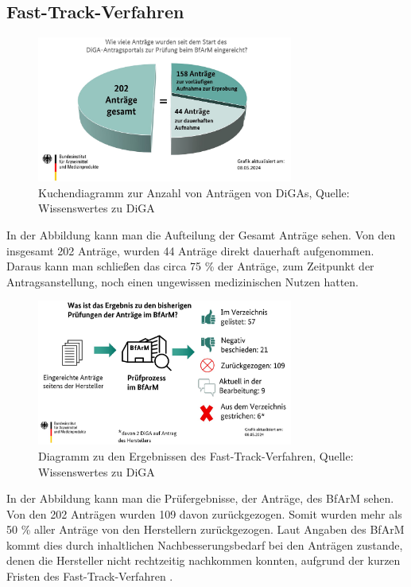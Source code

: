 \documentclass{article}
\begin{document}
		\subsection{Fast-Track-Verfahren} 
			\begin{figure}[htbp]
				\centering
				\includegraphics[width=0.75\textwidth]{./grafiken/Anzahl_Antraege_DiGA}
				\caption[Anzahl Anträge von DiGAs]{Kuchendiagramm zur Anzahl von Anträgen von DiGAs, Quelle: Wissenswertes zu DiGA \cite{wissenswertes-diga}}
				\label{Abb-antragsanzahl-diga}
			\end{figure}
			In der Abbildung kann man die Aufteilung der Gesamt Anträge sehen. Von den insgesamt 202 Anträge, wurden 44 Anträge direkt dauerhaft aufgenommen. Daraus kann man schließen das circa 75 \% der Anträge, zum Zeitpunkt der Antragsanstellung, noch einen ungewissen medizinischen Nutzen hatten.
		
			\begin{figure}[htbp]
				\centering
				\includegraphics[width=0.75\textwidth]{./grafiken/Ergebnis_Pruefungen_DiGA}
				\caption[Abbildung zu den Ergebnissen des Fast-Track-Verfahren]{Diagramm zu den Ergebnissen des Fast-Track-Verfahren, Quelle: Wissenswertes zu DiGA \cite{wissenswertes-diga}}
				\label{Abb-ergebnisse-ft}
			\end{figure} 
			In der Abbildung kann man die Prüfergebnisse, der Anträge, des BfArM sehen. Von den 202 Anträgen wurden 109 davon zurückgezogen. Somit wurden mehr als 50 \% aller Anträge von den Herstellern zurückgezogen. Laut Angaben des BfArM kommt dies durch inhaltlichen Nachbesserungsbedarf bei den Anträgen zustande, denen die Hersteller nicht rechtzeitig nachkommen konnten, aufgrund der kurzen Fristen des Fast-Track-Verfahren \cite[vgl. Z. 37]{tipps-diga-antragsansteller}. 
			
\end{document}
